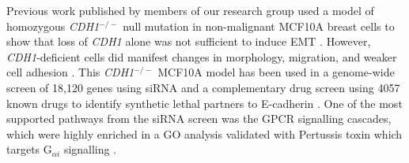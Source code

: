 Previous work published by members of our research group used a model of  homozygous \textit{CDH1}$^{-/-}$ null \gls{mutation} in non-malignant MCF10A breast cells to show that loss of \textit{CDH1} alone was not sufficient to induce \gls{EMT} %
\citep{Chen2014}. However, \textit{CDH1}-deficient cells did manifest changes in morphology, migration, and weaker cell adhesion \citep{Chen2014}.
%
This \textit{CDH1}$^{-/-}$  MCF10A model has been used in a \gls{genome}-wide screen of 18,120 genes using \gls{siRNA} and a complementary drug screen using 4057 known drugs to identify \gls{synthetic lethal} partners to \gls{E-cadherin} \citep{Telford2015}. One of the most supported pathways from the \gls{siRNA} screen was the \gls{GPCR} signalling cascades, which were highly enriched in a \acrfull{GO} analysis %
validated with Pertussis toxin which targets G$_{\alpha i}$ signalling \citep{Clark2004}. %



